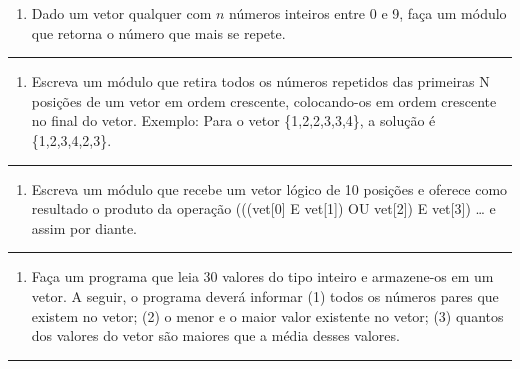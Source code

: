 \documentclass[12pt,a4paper]{article}
\renewcommand{\linethickness}{0.05em}
\providecommand{\tightlist}{%
      \setlength{\itemsep}{0pt}\setlength{\parskip}{0pt}}
\begin{document}
\begin{enumerate}
\def\labelenumi{\arabic{enumi}.}
\tightlist
\item
  Dado um vetor qualquer com \(n\) números inteiros entre 0 e 9, faça um
  módulo que retorna o número que mais se repete.
\end{enumerate}

    \begin{center}\rule{0.5\linewidth}{\linethickness}\end{center}

\begin{enumerate}
\def\labelenumi{\arabic{enumi}.}
\setcounter{enumi}{1}
\tightlist
\item
  Escreva um módulo que retira todos os números repetidos das primeiras
  N posições de um vetor em ordem crescente, colocando-os em ordem
  crescente no final do vetor. Exemplo: Para o vetor \{1,2,2,3,3,4\}, a
  solução é \{1,2,3,4,2,3\}.
\end{enumerate}

    \begin{center}\rule{0.5\linewidth}{\linethickness}\end{center}

\begin{enumerate}
\def\labelenumi{\arabic{enumi}.}
\setcounter{enumi}{2}
\tightlist
\item
  Escreva um módulo que recebe um vetor lógico de 10 posições e oferece
  como resultado o produto da operação (((vet{[}0{]} E vet{[}1{]}) OU
  vet{[}2{]}) E vet{[}3{]}) \ldots{} e assim por diante.
\end{enumerate}

    \begin{center}\rule{0.5\linewidth}{\linethickness}\end{center}

\begin{enumerate}
\def\labelenumi{\arabic{enumi}.}
\setcounter{enumi}{3}
\tightlist
\item
  Faça um programa que leia 30 valores do tipo inteiro e armazene-os em
  um vetor. A seguir, o programa deverá informar (1) todos os números
  pares que existem no vetor; (2) o menor e o maior valor existente no
  vetor; (3) quantos dos valores do vetor são maiores que a média desses
  valores.
\end{enumerate}

    \begin{center}\rule{0.5\linewidth}{\linethickness}\end{center}
\end{document}
